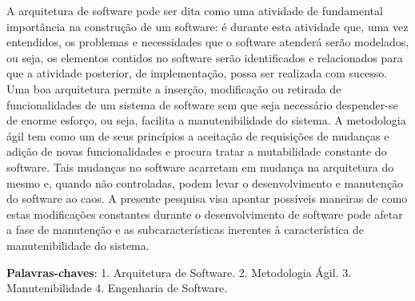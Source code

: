 \begin{resumo}
A arquitetura de software pode ser dita como uma atividade de fundamental importância na construção de um software: é durante esta atividade que, uma vez entendidos, os problemas e necessidades que o software atenderá serão modelados, ou seja, os elementos contidos no software serão identificados e relacionados para que a atividade posterior, de implementação, possa ser realizada com sucesso. Uma boa arquitetura permite a inserção, modificação ou retirada de funcionalidades de um sistema de software sem que seja necessário despender-se de enorme esforço, ou seja, facilita a manutenibilidade do sistema. A metodologia ágil tem como um de seus princípios a aceitação de requisições de mudanças e adição de novas funcionalidades e procura tratar a mutabilidade constante do software. Tais mudanças no software acarretam em mudança na arquitetura do mesmo e, quando não controladas, podem levar o desenvolvimento e manutenção do software ao caos. A presente pesquisa visa apontar possíveis maneiras de como estas modificações constantes durante o desenvolvimento de software pode afetar a fase de manutenção e as subcaracterísticas inerentes à característica de manutenibilidade do sistema.

 \vspace{\onelineskip}
    
 \noindent
 \textbf{Palavras-chaves}: 1. Arquitetura de Software. 2. Metodologia Ágil. 3. Manutenibilidade 4. Engenharia de Software. 
\end{resumo}
